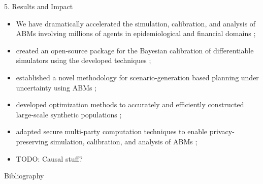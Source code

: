 \documentclass[final,hyperref={pdfpagelabels=false}]{beamer}
\begin{document}
\begin{frame}[t]
\begin{minipage}{\textwidth}
  \begin{block}{5. Results and Impact}
    \begin{itemize}
      \item We have dramatically accelerated the simulation, calibration, and analysis of ABMs involving millions of agents in epidemiological and financial domains \cite{10.5555/3545946.3598851, 10.1145/3604237.3626857, 10.5555/3545946.3598853, bayesian_diff, some_challenges};
      \item created an open-source package for the Bayesian calibration of differentiable simulators using the developed techniques \cite{blackbirds};
      \item established a novel methodology for scenario-generation based planning under uncertainty using ABMs \cite{synthpop};
      \item developed optimization methods to accurately and efficiently constructed large-scale synthetic populations \cite{mahmoodMultiobjectiveCombinatorialOptimisation};
      \item adapted secure multi-party computation techniques to enable privacy-preserving simulation, calibration, and analysis of ABMs \cite{decabm};
      \item TODO: Causal stuff?
  \end{itemize}
  \end{block}
  \begin{block}{Bibliography}
    \begin{multicols}{2}
      \linespread{0.928}\selectfont
      \scriptsize{}
    \end{multicols}
  \end{block}
\end{minipage}

\end{frame} %
\end{document}
